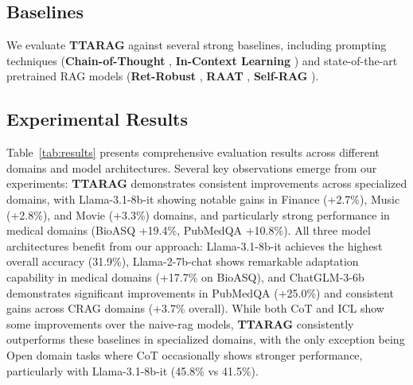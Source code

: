 \documentclass{article}
\newcommand{\ourmethod}{{\fontfamily{lmtt}\selectfont \textbf{TTARAG}}\xspace}
\begin{document}
\subsection{Baselines}
We evaluate \ourmethod against several strong baselines, including prompting techniques (\textbf{Chain-of-Thought} \cite{wei2022chain}, \textbf{In-Context Learning} \cite{brown2020language}) and state-of-the-art pretrained RAG models (\textbf{Ret-Robust} 
 \cite{robustlm}, \textbf{RAAT} \cite{fang2024enhancing} , \textbf{Self-RAG} \cite{asai2023self}). %

\subsection{Experimental Results}
Table~\ref{tab:results} presents comprehensive evaluation results across different domains and model architectures. Several key observations emerge from our experiments: \ourmethod demonstrates consistent improvements across specialized domains, with Llama-3.1-8b-it showing notable gains in Finance (+2.7\%), Music (+2.8\%), and Movie (+3.3\%) domains, and particularly strong performance in medical domains (BioASQ +19.4\%, PubMedQA +10.8\%). All three model architectures benefit from our approach: Llama-3.1-8b-it achieves the highest overall accuracy (31.9\%), Llama-2-7b-chat shows remarkable adaptation capability in medical domains (+17.7\% on BioASQ), and ChatGLM-3-6b demonstrates significant improvements in PubMedQA (+25.0\%) and consistent gains across CRAG domains (+3.7\% overall). While both CoT and ICL show some improvements over the naive-rag models, \ourmethod consistently outperforms these baselines in specialized domains, with the only exception being Open domain tasks where CoT occasionally shows stronger performance, particularly with Llama-3.1-8b-it (45.8\% vs 41.5\%).
\end{document}
